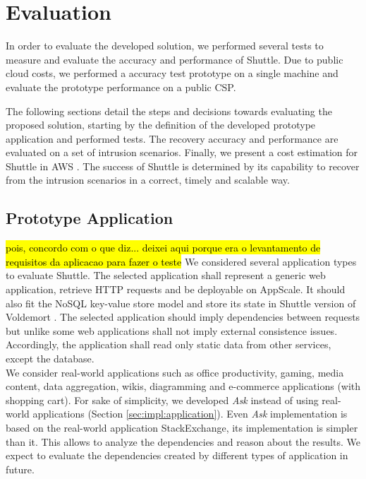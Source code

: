\chapter{Evaluation}\label{chapter:evaluation}
In order to evaluate the developed solution, we performed several tests to measure and evaluate the accuracy and performance of Shuttle. Due to public cloud costs, we performed a accuracy test prototype on a single machine and evaluate the prototype performance on a public \acf{CSP}.

The following sections detail the steps and decisions towards evaluating the proposed solution, starting by the definition of the developed prototype application and performed tests. The recovery accuracy and performance are evaluated on a set of intrusion scenarios. Finally, we present a cost estimation for Shuttle in \ac{AWS} \cite{aws}. The success of Shuttle is determined by its capability to recover from the intrusion scenarios in a correct, timely and scalable way.


\section{Prototype Application}
\hl{pois, concordo com o que diz... deixei aqui porque era o levantamento de requisitos da aplicacao para fazer o teste}
 We considered several application types to evaluate Shuttle. The selected application shall represent a generic web application, retrieve \ac{HTTP} requests and be deployable on AppScale. It should also fit the \acs{NoSQL} key-value store model and store its state in Shuttle version of Voldemort \cite{Kreps}. The selected application should imply dependencies between requests but unlike some web applications shall not imply external consistence issues. Accordingly, the application shall read only static data from other services, except the database.\\

We consider real-world applications such as office productivity, gaming, media content, data aggregation, wikis, diagramming and e-commerce applications (with shopping cart). For sake of simplicity, we developed \textit{Ask} instead of using real-world applications (Section \ref{sec:impl:application}). Even \textit{Ask} implementation is based on the real-world application StackExchange, its implementation is simpler than it. This allows to analyze the dependencies and reason about the results. We expect to evaluate the dependencies created by different types of application in future.

